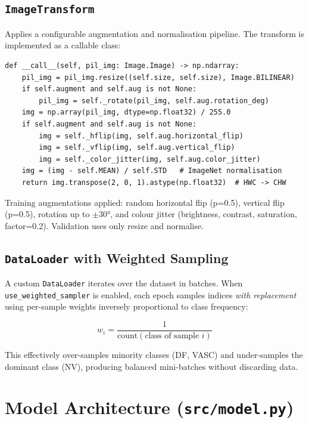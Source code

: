 \documentclass[12pt,a4paper]{report}
\begin{document}
\subsection{\texttt{ImageTransform}}

Applies a configurable augmentation and normalisation pipeline. The transform is implemented as a callable class:

\begin{lstlisting}[caption={Core transform call --- augmentation and normalisation},label={lst:transform}]
def __call__(self, pil_img: Image.Image) -> np.ndarray:
    pil_img = pil_img.resize((self.size, self.size), Image.BILINEAR)
    if self.augment and self.aug is not None:
        pil_img = self._rotate(pil_img, self.aug.rotation_deg)
    img = np.array(pil_img, dtype=np.float32) / 255.0
    if self.augment and self.aug is not None:
        img = self._hflip(img, self.aug.horizontal_flip)
        img = self._vflip(img, self.aug.vertical_flip)
        img = self._color_jitter(img, self.aug.color_jitter)
    img = (img - self.MEAN) / self.STD   # ImageNet normalisation
    return img.transpose(2, 0, 1).astype(np.float32)  # HWC -> CHW
\end{lstlisting}

Training augmentations applied: random horizontal flip (p=0.5), vertical flip (p=0.5), rotation up to $\pm30°$, and colour jitter (brightness, contrast, saturation, factor=0.2). Validation uses only resize and normalise.

\subsection{\texttt{DataLoader} with Weighted Sampling}

A custom \texttt{DataLoader} iterates over the dataset in batches. When \texttt{use\_weighted\_sampler} is enabled, each epoch samples indices \textit{with replacement} using per-sample weights inversely proportional to class frequency:

\[
  w_i = \frac{1}{\text{count}(\text{class of sample } i)}
\]

This effectively over-samples minority classes (DF, VASC) and under-samples the dominant class (NV), producing balanced mini-batches without discarding data.

\section{Model Architecture (\texttt{src/model.py})}
\end{document}
